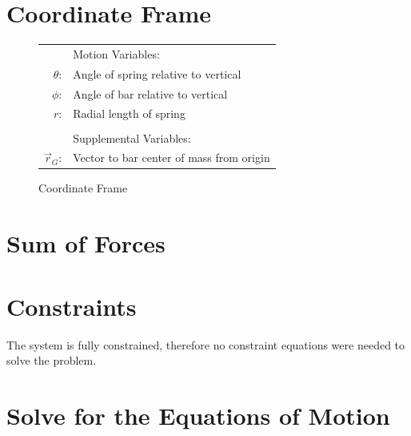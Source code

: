 \documentclass[12pt]{report}
\begin{document}
\begin{flushleft}
\section{Coordinate Frame} \label{section:coord}
\begin{figure}[!htp]
    \begin{minipage}[c]{.4\textwidth}
      \center
      
      \caption{Coordinate Frame}
      \label{coord}
      \vspace{2ex}
    \end{minipage}%
    \begin{minipage}[c]{.6\textwidth}
      \center
      \begin{tabular}{rl}
      & \quad Motion Variables: \\
      $\theta$:& Angle of spring relative to vertical\\
      $\phi$:& Angle of bar relative to vertical\\
      $r$:& Radial length of spring \\
      \\
      & \quad Supplemental Variables: \\
      $\vec{r}_G$:& Vector to bar center of mass from origin \\
    \end{tabular}
    \end{minipage}
\end{figure}
\section{Sum of Forces}

\section{Constraints}
The system is fully constrained, therefore no constraint equations were needed to
solve the problem.
\section{Solve for the Equations of Motion}


\end{flushleft}
\end{document}
